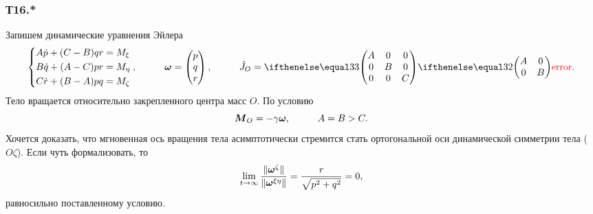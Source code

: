 \subsubsection*{Т16.*}


Запишем динамические уравнения Эйлера
\begin{equation}
    \left\{\begin{aligned}
        A \dot{p} + (C-B) q r &= M_{\xi} \\
        B \dot{q} + (A-C) p r &= M_{\eta} \\
        C \dot{r} + (B-A) p q &= M_{\zeta} \\
    \end{aligned}\right.,
    \hspace{1cm} 
    \vc{\omega} = \begin{pmatrix}
        p \\ q \\ r
    \end{pmatrix}, 
    \hspace{1cm} 
    \hat{J}_O = \dmat{3}{A}{B}{C}.
\end{equation}
Тело вращается относительно закрепленного центра масс $O$. По условию
\begin{equation*}
    \mbox{\boldmath $M$}_O = - \gamma \mbox{\boldmath $\omega$},
    \hspace{1cm} 
    A = B > C.
\end{equation*}
Хочется доказать, что мгновенная ось вращения тела асимптотически стремится стать ортогональной оси динамической симметрии тела ($O\zeta$). Если чуть формализовать, то 
\begin{equation}
\label{lim}
    \lim_{t \to \infty} \frac{\|\mbox{\boldmath $\omega$}^{\zeta}\|}{\|\mbox{\boldmath $\omega$}^{\xi\eta}\|} = \frac{r}{\sqrt{p^2+q^2}} = 0,
\end{equation}
равносильно поставленному условию.

